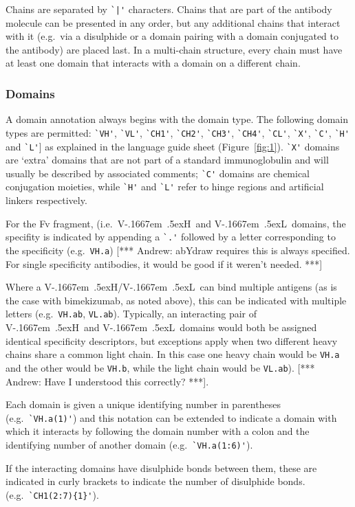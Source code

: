 \documentclass[a4]{article}
\newcommand{\VH}{\mbox{V\kern-.1667em \lower.5ex\hbox{\scriptsize H}}}
\newcommand{\VL}{\mbox{V\kern-.1667em \lower.5ex\hbox{\scriptsize L}}}
\newcommand{\VHVL}{\mbox{\VH/\VL}}
\newcommand{\andrew}[1]{{\color{red} [*** Andrew: #1 ***]}}
\begin{document}
Chains are separated by \verb.`|'.
characters. Chains that are part of the antibody molecule can be
presented in any order, but any additional chains that interact with it
(e.g.\ via a disulphide or a domain pairing with a domain conjugated to the antibody)
are placed last. In a multi-chain structure, every chain must have at least one domain
that interacts with a domain on a different chain.

\subsubsection{Domains}
A domain annotation always begins with the domain type.
The following domain types are permitted: 
\verb|`VH'|, \verb|`VL'|,
\verb|`CH1'|, \verb|`CH2'|, \verb|`CH3'|, \verb|`CH4'|, \verb|`CL'|,
\verb|`X'|, \verb|`C'|, \verb|`H'| and \verb|`L'|] as explained in the
language guide sheet (Figure~\ref{fig:1}). 
\verb|`X'| domains are `extra' domains that are not part of a
standard immunoglobulin and will usually be described by associated comments;
\verb|`C'| domains are chemical conjugation moieties, while \verb|`H'|
and \verb|`L'| refer to hinge regions and artificial linkers respectively.

For the Fv fragment, (i.e.\ \VH\ and \VL\ domains, the specifity is
indicated by appending a \verb|`.'| followed by a letter corresponding
to the specificity (e.g.\ \verb|VH.a|)  \andrew{abYdraw requires this
  is always specified. For single specificity antibodies, it would be
  good if it weren't needed.}

Where a \VHVL\ can bind multiple antigens (as is the case with
bimekizumab, as noted above), this can be indicated with multiple
letters (e.g.\ \verb|VH.ab|, \verb|VL.ab|).
Typically, an interacting pair of \VH\ and \VL\ domains
would both be assigned identical specificity descriptors, but
exceptions apply when two different heavy chains share a common light
chain.
In this case one heavy chain would be \verb|VH.a| and the other would
be \verb|VH.b|, while the light chain would be \verb|VL.ab|).
\andrew{Have I understood this correctly?}.


Each domain is given a unique identifying number in parentheses (e.g.\
\verb|`VH.a(1)'|) and this notation can be extended to indicate a domain
with which it interacts by following the domain number with a colon
and the identifying number of another domain (e.g.\
\verb|`VH.a(1:6)'|).

If the interacting domains have disulphide bonds between them, these
are indicated in curly brackets to indicate
the number of disulphide bonds. (e.g.\ \verb|`CH1(2:7){1}'|).
\end{document}
